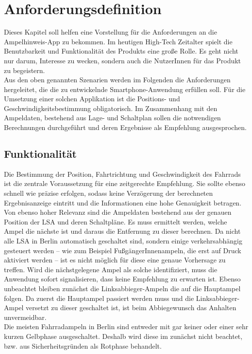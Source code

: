 \chapter{\label{chap:anforderungen}Anforderungsdefinition}
Dieses Kapitel soll helfen eine Vorstellung für die Anforderungen an die Ampelhinweis-\gls{App} zu bekommen. Im heutigen High-Tech Zeitalter spielt die Benutzbarkeit und Funktionalität des Produkts eine große Rolle. Es geht nicht nur darum, Interesse zu wecken, sondern auch die NutzerInnen für das Produkt zu begeistern. \\
Aus den oben genannten Szenarien werden im Folgenden die Anforderungen hergeleitet, die die zu entwickelnde \gls{Smartphone}-Anwendung erfüllen soll. Für die Umsetzung einer solchen Applikation ist die Positions- und Geschwindigkeitsbestimmung obligatorisch. Im Zusammenhang mit den Ampeldaten, bestehend aus Lage- und Schaltplan sollen die notwendigen Berechnungen durchgeführt und deren Ergebnisse als Empfehlung ausgesprochen.
\section{Funktionalität}
Die Bestimmung der Position, Fahrtrichtung und Geschwindigkeit des Fahrrads ist die zentrale Voraussetzung für eine zeitgerechte Empfehlung. Sie sollte ebenso schnell wie präzise erfolgen, sodass keine Verzögerung der berechneten Ergebnisanzeige eintritt und die Informationen eine hohe Genauigkeit betragen.\\
Von ebenso hoher Relevanz sind die Ampeldaten bestehend aus der genauen Position der \gls{LSA} und deren Schaltpläne. Es muss ermittelt werden, welche Ampel die nächste ist und daraus die Entfernung zu dieser berechnen. Da nicht alle \gls{LSA} in Berlin automatisch geschaltet sind, sondern einige verkehrsabhängig gesteuert werden -- wie zum Beispiel FußgängerInnenampeln, die erst auf Druck aktiviert werden -- ist es nicht möglich für diese eine genaue Vorhersage zu treffen. Wird die nächstgelegene Ampel als solche identifiziert, muss die Anwendung sofort signalisieren, dass keine Empfehlung zu erwarten ist. Ebenso unbeachtet bleiben zunächst die Linksabbieger-Ampeln die auf die Hauptampel folgen. Da zuerst die Hauptampel passiert werden muss und die Linksabbieger-Ampel versetzt zu dieser geschaltet ist, ist beim Abbiegewunsch das Anhalten unvermeidbar.\\
Die meisten Fahrradampeln in Berlin sind entweder mit gar keiner oder einer sehr kurzen Gelbphase ausgeschaltet. Deshalb wird diese im zunächst nicht beachtet, bzw. aus Sicherheitsgründen als Rotphase behandelt.
